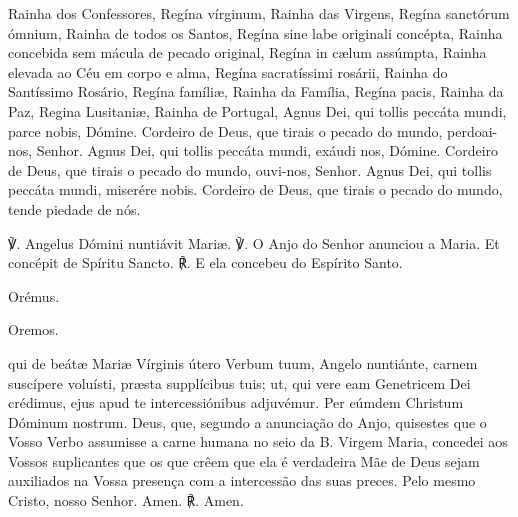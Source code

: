 \begin{paracol}{2}
\switchcolumn
Rainha dos Confessores,
\switchcolumn*
Regína vírginum,
\switchcolumn
Rainha das Virgens,
\switchcolumn*
Regína sanctórum ómnium,
\switchcolumn
Rainha de todos os Santos,
\switchcolumn*
Regína sine labe originali concépta,
\switchcolumn
Rainha concebida sem mácula de pecado original,
\switchcolumn*
Regína in cælum assúmpta,
\switchcolumn
Rainha elevada ao Céu em corpo e alma,
\switchcolumn*
Regína sacratíssimi rosárii,
\switchcolumn
Rainha do Santíssimo Rosário,
\switchcolumn*
Regína famíliæ,
\switchcolumn
Rainha da Família,
\switchcolumn*
Regína pacis,
\switchcolumn
Rainha da Paz,
\switchcolumn*
Regina Lusitaniæ,
\switchcolumn
Rainha de Portugal,
\switchcolumn*
Agnus Dei, qui tollis peccáta mundi, parce nobis, Dómine.
\switchcolumn
Cordeiro de Deus, que tirais o pecado do mundo, perdoai-nos, Senhor.
\switchcolumn*
Agnus Dei, qui tollis peccáta mundi, exáudi nos, Dómine.
\switchcolumn
Cordeiro de Deus, que tirais o pecado do mundo, ouvi-nos, Senhor.
\switchcolumn*
Agnus Dei, qui tollis peccáta mundi, miserére nobis.
\switchcolumn
Cordeiro de Deus, que tirais o pecado do mundo, tende piedade de nós.
\end{paracol}

\begin{nscenter}\emph{}\end{nscenter}

\begin{paracol}{2}
{\redx ℣.} Angelus Dómini nuntiávit Mariæ.
\switchcolumn
{\redx ℣.} O Anjo do Senhor anunciou a Maria.
 Et concépit de Spíritu Sancto.
\switchcolumn
{\redx ℟.} E ela concebeu do Espírito Santo.
\switchcolumn*
\begin{nscenter} {\redx Orémus.} \end{nscenter}
\switchcolumn
\begin{nscenter} {\redx Oremos.} \end{nscenter}
\switchcolumn*
{}qui de beátæ Mariæ Vírginis útero Verbum tuum, Angelo nuntiánte, carnem suscípere voluísti, præsta supplícibus tuis; ut, qui vere eam Genetricem Dei crédimus, ejus apud te intercessiónibus adjuvémur. Per eúmdem Christum Dóminum nostrum.
\switchcolumn
{}Deus, que, segundo a anunciação do Anjo, quisestes que o Vosso Verbo assumisse a carne humana no seio da B. Virgem Maria, concedei aos Vossos suplicantes que os que crêem que ela é verdadeira Mãe de Deus sejam auxiliados na Vossa presença com a intercessão das suas preces. Pelo mesmo Cristo, nosso Senhor.
 Amen.
\switchcolumn
{\redx ℟.} Amen.
\end{paracol}

